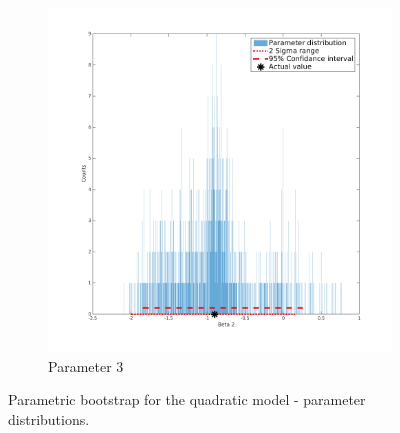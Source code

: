 \documentclass[11pt,a4paper,oneside]{report}
\begin{document}
\begin{figure}[H]
  \begin{subfigure}[b]{0.5\textwidth}
    \includegraphics[width=\textwidth, trim=0 0 0 0,clip=true]{figures/task5/parDistM2P3.png}
    \caption{Parameter 3}
  \end{subfigure}%
  
  \caption{Parametric bootstrap for the quadratic model - parameter distributions.}
  \label{fig:c5distM2}
\end{figure}
\end{document}
